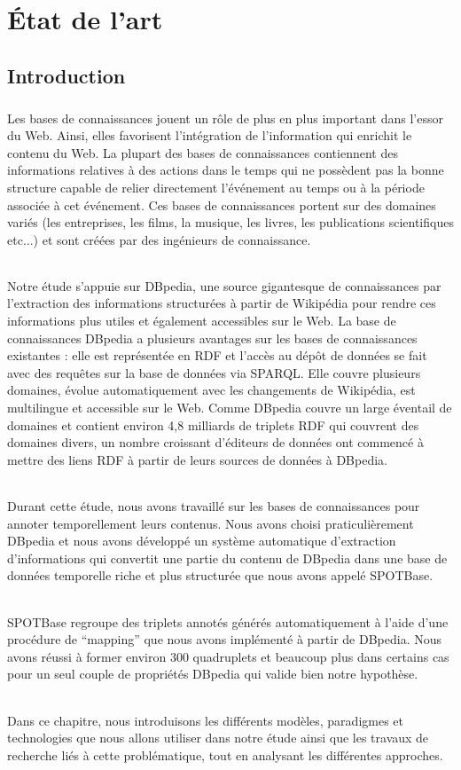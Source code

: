 \chapter{État de l'art}
\section{Introduction}
\paragraph{}
Les bases de connaissances jouent un rôle de plus en plus important dans l'essor du Web. Ainsi, elles favorisent l'intégration de l'information qui enrichit le contenu du Web. La plupart des bases de connaissances contiennent des informations relatives à des actions dans le temps qui ne possèdent pas la bonne structure capable de relier directement l'événement au temps ou à la période associée à cet événement.
Ces bases de connaissances portent sur des domaines variés (les entreprises, les films, la musique, les livres, les publications scientifiques etc...) et sont créées par des ingénieurs de connaissance. 
\subparagraph{}
Notre étude s'appuie sur DBpedia, une source gigantesque de connaissances par l'extraction des informations structurées à partir de Wikipédia pour rendre ces informations plus utiles et également accessibles sur le Web. La base de connaissances DBpedia a plusieurs avantages sur les bases de connaissances existantes : elle est représentée en RDF et l'accès au dépôt de données se fait avec des requêtes sur la base de données via SPARQL. Elle couvre plusieurs domaines, évolue automatiquement avec les changements de Wikipédia, est multilingue et accessible sur le Web. 
Comme DBpedia couvre un large éventail de domaines et contient environ 4,8 milliards de triplets RDF qui couvrent des domaines divers, un nombre croissant d'éditeurs de données ont commencé à mettre des liens RDF à partir de leurs sources de données à DBpedia.
\subparagraph{}
Durant cette étude, nous avons travaillé sur les bases de connaissances pour annoter temporellement leurs contenus. Nous avons choisi praticulièrement DBpedia et nous avons développé un système automatique d'extraction d'informations qui convertit une partie du contenu de DBpedia dans une base de données temporelle riche et plus structurée que nous avons appelé SPOTBase.
\subparagraph{}
SPOTBase regroupe des triplets annotés générés automatiquement à l'aide d'une procédure de ``mapping'' que nous avons implémenté à partir de DBpedia.
Nous avons réussi à former environ $300$ quadruplets et beaucoup plus dans certains cas pour un seul couple de propriétés DBpedia qui valide bien notre hypothèse.
\subparagraph{}
Dans ce chapitre, nous introduisons les différents modèles, paradigmes et technologies que nous allons utiliser dans notre étude ainsi que les travaux de recherche liés à cette problématique, tout en analysant les différentes approches.
